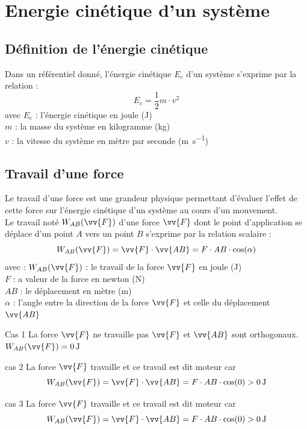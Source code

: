 \documentclass[a4paper,11pt,fleqn]{scrartcl}%
\begin{document}
	\maketitle

\section{Energie cinétique d'un système}
    \subsection{Définition de l'énergie cinétique}
    \begin{cours}
        Dans un référentiel donné, l'énergie cinétique $E_c$ d'un système s'exprime par la relation : $$E_c = \dfrac{1}{2} m\cdot v^2 $$
        avec $E_c$ : l'énergie cinétique en joule (\unit{\joule})\\
        $m$ : la masse du système en kilogramme (\unit{\kilo\gram})\\
        $v$ : la vitesse du système en mètre par seconde (\unit{\meter\per\second})
    \end{cours}

    \subsection{Travail d'une force}
    Le travail d'une force est une grandeur physique permettant d'évaluer l'effet de cette force sur l'énergie cinétique d'un système au cours d'un mouvement.\\
    Le travail noté $W_{AB}(\vv{F})$ d'une force $\vv{F}$ dont le point d'application se déplace d'un point $A$ vers un point $B$ s'exprime par la relation scalaire : $$W_{AB}(\vv{F}) = \vv{F} \cdot \vv{AB} = F \cdot AB \cdot \cos(\alpha) $$
    avec : $W_{AB}(\vv{F})$ : le travail de la force $\vv{F}$ en joule (\unit{\joule})\\
    $F$ : a valeur de la force en newton (\unit{\newton})\\
    $AB$ : le déplacement en mètre (\unit{\meter})\\
    $\alpha$ : l'angle entre la direction de la force $\vv{F}$ et celle du déplacement $\vv{AB}$

    \begin{documentboxenv}{Cas 1}
        La force $\vv{F}$ ne travaille pas $\vv{F}$ et $\vv{AB}$ sont orthogonaux. $W_{AB}(\vv{F}) = \SI{0}{\joule}$
    \end{documentboxenv}

     \begin{documentboxenv}{cas 2}
        La force $\vv{F}$ travaille et ce travail est dit moteur car $$W_{AB}(\vv{F}) = \vv{F}\cdot \vv{AB}  = F \cdot AB \cdot \cos(0)> \SI{0}{\joule}$$
    \end{documentboxenv}

    \begin{documentboxenv}{cas 3}
        La force $\vv{F}$ travaille et ce travail est dit moteur car $$W_{AB}(\vv{F}) = \vv{F}\cdot \vv{AB}  = F \cdot AB \cdot \cos(0)> \SI{0}{\joule}$$
    \end{documentboxenv}
	
	
\end{document}
